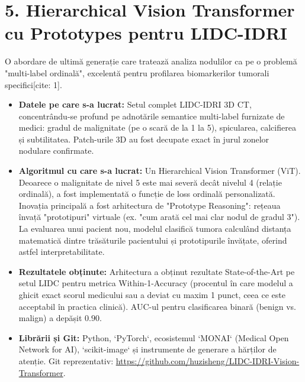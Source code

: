 \documentclass[runningheads,a4paper,11pt]{report}
\begin{document}
\section{5. Hierarchical Vision Transformer cu Prototypes pentru LIDC-IDRI}
O abordare de ultimă generație care tratează analiza nodulilor ca pe o problemă "multi-label ordinală", excelentă pentru profilarea biomarkerilor tumorali specifici[cite: 1].
\begin{itemize}
    \item \textbf{Datele pe care s-a lucrat:} Setul complet LIDC-IDRI 3D CT, concentrându-se profund pe adnotările semantice multi-label furnizate de medici: gradul de malignitate (pe o scară de la 1 la 5), spicularea, calcifierea și subtilitatea. Patch-urile 3D au fost decupate exact în jurul zonelor nodulare confirmate.
    \item \textbf{Algoritmul cu care s-a lucrat:} Un Hierarchical Vision Transformer (ViT). Deoarece o malignitate de nivel 5 este mai severă decât nivelul 4 (relație ordinală), a fost implementată o funcție de loss ordinală personalizată. Inovația principală a fost arhitectura de "Prototype Reasoning": rețeaua învață "prototipuri" virtuale (ex. "cum arată cel mai clar nodul de gradul 3"). La evaluarea unui pacient nou, modelul clasifică tumora calculând distanța matematică dintre trăsăturile pacientului și prototipurile învățate, oferind astfel interpretabilitate.
    \item \textbf{Rezultatele obținute:} Arhitectura a obținut rezultate State-of-the-Art pe setul LIDC pentru metrica Within-1-Accuracy (procentul în care modelul a ghicit exact scorul medicului sau a deviat cu maxim 1 punct, ceea ce este acceptabil în practica clinică). AUC-ul pentru clasificarea binară (benign vs. malign) a depășit $0.90$.
    \item \textbf{Librării și Git:} Python, `PyTorch`, ecosistemul `MONAI` (Medical Open Network for AI), `scikit-image` și instrumente de generare a hărților de atenție. Git reprezentativ: \url{https://github.com/huzisheng/LIDC-IDRI-Vision-Transformer}.
\end{itemize}
\end{document}
